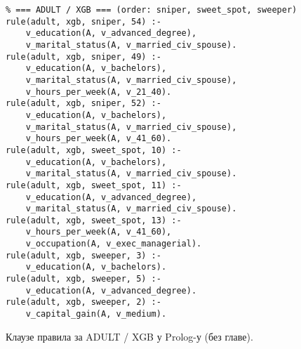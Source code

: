\begin{appendices}
\begin{listing}[H]
\begin{verbatim}
% === ADULT / XGB === (order: sniper, sweet_spot, sweeper)
rule(adult, xgb, sniper, 54) :-
    v_education(A, v_advanced_degree),
    v_marital_status(A, v_married_civ_spouse).
rule(adult, xgb, sniper, 49) :-
    v_education(A, v_bachelors),
    v_marital_status(A, v_married_civ_spouse),
    v_hours_per_week(A, v_21_40).
rule(adult, xgb, sniper, 52) :-
    v_education(A, v_bachelors),
    v_marital_status(A, v_married_civ_spouse),
    v_hours_per_week(A, v_41_60).
rule(adult, xgb, sweet_spot, 10) :-
    v_education(A, v_bachelors),
    v_marital_status(A, v_married_civ_spouse).
rule(adult, xgb, sweet_spot, 11) :-
    v_education(A, v_advanced_degree),
    v_marital_status(A, v_married_civ_spouse).
rule(adult, xgb, sweet_spot, 13) :-
    v_hours_per_week(A, v_41_60),
    v_occupation(A, v_exec_managerial).
rule(adult, xgb, sweeper, 3) :-
    v_education(A, v_bachelors).
rule(adult, xgb, sweeper, 5) :-
    v_education(A, v_advanced_degree).
rule(adult, xgb, sweeper, 2) :-
    v_capital_gain(A, v_medium).
\end{verbatim}
\caption{Клаузе правила за ADULT / XGB у Prolog-у (без главе).}
\label{code:prologbk-adult-xgb}
\end{listing}


\end{appendices}
